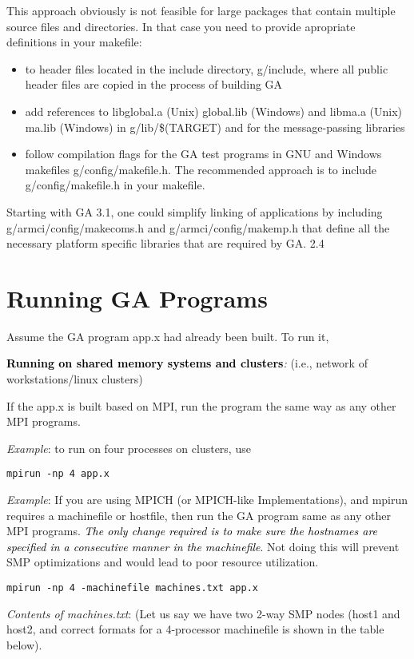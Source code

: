 This approach obviously is not feasible for large packages that contain
multiple source files and directories. In that case you need to provide
apropriate definitions in your makefile:
\begin{itemize}
\item to header files located in the include directory, g/include, where
all public header files are copied in the process of building GA 
\item add references to libglobal.a (Unix) global.lib (Windows) and libma.a
(Unix) ma.lib (Windows) in g/lib/\$(TARGET) and for the message-passing
libraries 
\item follow compilation flags for the GA test programs in GNU and Windows
makefiles g/config/makefile.h. The recommended approach is to include
g/config/makefile.h in your makefile.
\end{itemize}
Starting with GA 3.1, one could simplify linking of applications by
including g/armci/config/makecoms.h and g/armci/config/makemp.h that
define all the necessary platform specific libraries that are required
by GA. 2.4 


\section{Running GA Programs }

Assume the GA program app.x had already been built. To run it,

\textbf{\textcolor{black}{Running on shared memory systems and clusters}}\emph{:
}(i.e., network of workstations/linux clusters)

If the app.x is built based on MPI, run the program the same way as
any other MPI programs. 

\emph{Example}: to run on four processes on clusters, use 
\begin{verbatim}
mpirun -np 4 app.x
\end{verbatim}
\emph{Example}: If you are using MPICH (or MPICH-like Implementations),
and mpirun requires a machinefile or hostfile, then run the GA program
same as any other MPI programs. \textit{\textcolor{black}{The only
change required is to make sure the hostnames are specified in a consecutive
manner in the machinefile}}. Not doing this will prevent SMP optimizations
and would lead to poor resource utilization.
\begin{verbatim}
mpirun -np 4 -machinefile machines.txt app.x
\end{verbatim}
\emph{Contents of machines.txt}: (Let us say we have two 2-way SMP
nodes (host1 and host2, and correct formats for a 4-processor machinefile
is shown in the table below).

